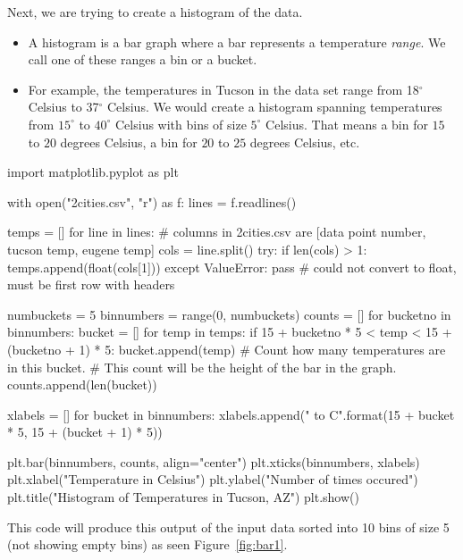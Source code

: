 \documentclass[11pt]{cselabheader}
\begin{document}
Next, we are trying to create a histogram of the data.

\begin{itemize}
  \item A histogram is a bar graph where a bar represents
    a temperature \emph{range}. We call one of these ranges a bin or a bucket.
  \item 
    For example, the temperatures in Tucson in the data set
    range from 18$^\circ$ Celsius to 37$^\circ$ Celsius. We would create a
    histogram spanning temperatures from $15^\circ$ to $40^\circ$ Celsius with
    bins of size $5^\circ$ Celsius. That means a bin for $15$ to $20$ degrees
    Celsius, a bin for $20$ to $25$ degrees Celsius, etc.
\end{itemize}

\begin{python3code}
import matplotlib.pyplot as plt

with open("2cities.csv", "r") as f:
    lines = f.readlines()

temps = []
for line in lines:
    # columns in 2cities.csv are [data point number, tucson temp, eugene temp]
    cols = line.split()
    try:
        if len(cols) > 1:
            temps.append(float(cols[1]))
    except ValueError:
        pass # could not convert to float, must be first row with headers

numbuckets = 5
binnumbers = range(0, numbuckets)
counts = []
for bucketno in binnumbers:
    bucket = []
    for temp in temps:
        if 15 + bucketno * 5 < temp < 15 + (bucketno + 1) * 5:
            bucket.append(temp)
    # Count how many temperatures are in this bucket.
    # This count will be the height of the bar in the graph.
    counts.append(len(bucket))

xlabels = []
for bucket in binnumbers:
    xlabels.append("{} to {}C".format(15 + bucket * 5, 15 + (bucket + 1) * 5))

plt.bar(binnumbers, counts, align="center")
plt.xticks(binnumbers, xlabels)
plt.xlabel("Temperature in Celsius")
plt.ylabel("Number of times occured")
plt.title("Histogram of Temperatures in Tucson, AZ")
plt.show()
\end{python3code}

This code will produce this output of the input data sorted into 10 bins of size
5 (not showing empty bins) as seen Figure~\ref{fig:bar1}.
\end{document}
